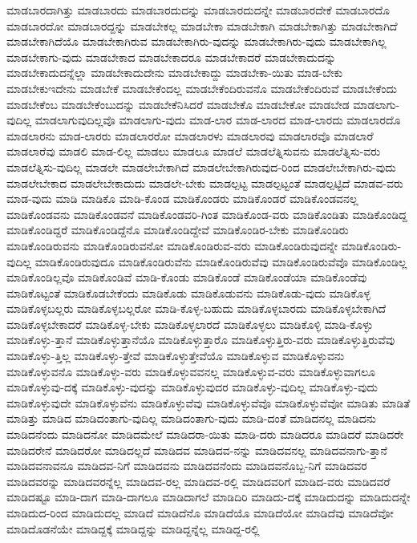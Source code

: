 {ಮಾಡಬಾರದಾಗಿತ್ತು
ಮಾಡಬಾರದು
ಮಾಡಬಾರದುದನ್ನು
ಮಾಡಬಾರದುದನ್ನೇ
ಮಾಡಬಾರದೇಕೆ
ಮಾಡಬಾರದೊ
ಮಾಡಬಾರದೋ
ಮಾಡಬಾರದ್ದನ್ನು
ಮಾಡಬೇಕಲ್ಲ
ಮಾಡಬೇಕಾ
ಮಾಡಬೇಕಾಗಿ
ಮಾಡಬೇಕಾಗಿತ್ತು
ಮಾಡಬೇಕಾಗಿದೆ
ಮಾಡಬೇಕಾಗಿದೆಯೊ
ಮಾಡಬೇಕಾಗಿರುವ
ಮಾಡಬೇಕಾಗಿರು-ವುದನ್ನು
ಮಾಡಬೇಕಾಗಿರು-ವುದು
ಮಾಡಬೇಕಾಗಿಲ್ಲ
ಮಾಡಬೇಕಾಗು-ವುದು
ಮಾಡಬೇಕಾದ
ಮಾಡಬೇಕಾದರೂ
ಮಾಡಬೇಕಾದರೆ
ಮಾಡಬೇಕಾದುದನ್ನು
ಮಾಡಬೇಕಾದುದನ್ನೆಲ್ಲಾ
ಮಾಡಬೇಕಾದುದೇನು
ಮಾಡಬೇಕಾದ್ದು
ಮಾಡಬೇಕಾ-ಯಿತು
ಮಾಡ-ಬೇಕು
ಮಾಡಬೇಕುಇದೇನು
ಮಾಡಬೇಕೆ
ಮಾಡಬೇಕೆಂದಲ್ಲ
ಮಾಡಬೇಕೆಂದಿರುವನೊ
ಮಾಡಬೇಕೆಂದಿರುವೆ
ಮಾಡಬೇಕೆಂದು
ಮಾಡಬೇಕೆಂಬ
ಮಾಡಬೇಕೆಂಬುದನ್ನು
ಮಾಡಬೇಕೆನಿಸಿದರೆ
ಮಾಡಬೇಕೊ
ಮಾಡಬೇಕೋ
ಮಾಡಬೇಡ
ಮಾಡಲಾಗು-ವುದಿಲ್ಲ
ಮಾಡಲಾಗುವುದಿಲ್ಲವೊ
ಮಾಡಲಾಗು-ವುದು
ಮಾಡ-ಲಾರ
ಮಾಡ-ಲಾರದ
ಮಾಡ-ಲಾರದು
ಮಾಡಲಾರದೊ
ಮಾಡಲಾರನು
ಮಾಡ-ಲಾರರು
ಮಾಡಲಾರರೋ
ಮಾಡಲಾರಳು
ಮಾಡಲಾರವು
ಮಾಡಲಾರವೊ
ಮಾಡಲಾರೆ
ಮಾಡಲಾರೆವು
ಮಾಡಲಿ
ಮಾಡ-ಲಿಲ್ಲ
ಮಾಡಲು
ಮಾಡಲೂ
ಮಾಡಲೆ
ಮಾಡಲೆತ್ನಿಸುವನು
ಮಾಡಲೆತ್ನಿಸು-ವರು
ಮಾಡಲೆತ್ನಿಸು-ವುದಿಲ್ಲ
ಮಾಡಲೇ
ಮಾಡಲೇಬೇಕಾಗಿದೆ
ಮಾಡಲೇಬೇಕಾಗಿರುವುದ-ರಿಂದ
ಮಾಡಲೇಬೇಕಾಗಿರು-ವುದು
ಮಾಡಲೇಬೇಕಾದ
ಮಾಡಲೇಬೇಕಾದುದು
ಮಾಡಲೇ-ಬೇಕು
ಮಾಡಲ್ಪಟ್ಟ
ಮಾಡಲ್ಪಟ್ಟಂತೆ
ಮಾಡಲ್ಪಟ್ಟಿದೆ
ಮಾಡವ-ವರು
ಮಾಡ-ವುದು
ಮಾಡಿ
ಮಾಡಿಕೊ
ಮಾಡಿ-ಕೊಂಡ
ಮಾಡಿಕೊಂಡರು
ಮಾಡಿಕೊಂಡರೆ
ಮಾಡಿಕೊಂಡವನಲ್ಲ
ಮಾಡಿಕೊಂಡವನು
ಮಾಡಿಕೊಂಡವನೆ
ಮಾಡಿಕೊಂಡವರಿ-ಗಿಂತ
ಮಾಡಿಕೊಂಡ-ವರು
ಮಾಡಿಕೊಂಡಿತು
ಮಾಡಿಕೊಂಡಿದ್ದ
ಮಾಡಿಕೊಂಡಿದ್ದರೆ
ಮಾಡಿಕೊಂಡಿದ್ದೆನೊ
ಮಾಡಿಕೊಂಡಿದ್ದೇವೆ
ಮಾಡಿಕೊಂಡಿರ-ಬೇಕು
ಮಾಡಿಕೊಂಡಿರು
ಮಾಡಿಕೊಂಡಿರುವನು
ಮಾಡಿಕೊಂಡಿರುವನೋ
ಮಾಡಿಕೊಂಡಿರುವ-ವರು
ಮಾಡಿಕೊಂಡಿರುವುದನ್ನೇ
ಮಾಡಿಕೊಂಡಿರು-ವುದಿಲ್ಲ
ಮಾಡಿಕೊಂಡಿರುವುದೂ
ಮಾಡಿಕೊಂಡಿರುವೆನು
ಮಾಡಿಕೊಂಡಿರುವೆವು
ಮಾಡಿಕೊಂಡಿರುವೆವೊ
ಮಾಡಿಕೊಂಡಿಲ್ಲ
ಮಾಡಿಕೊಂಡಿಲ್ಲವೊ
ಮಾಡಿಕೊಂಡಿವೆ
ಮಾಡಿ-ಕೊಂಡು
ಮಾಡಿಕೊಂಡೆ
ಮಾಡಿಕೊಂಡೆಯಾ
ಮಾಡಿಕೊಂಡೆವು
ಮಾಡಿಕೊಟ್ಟಂತೆ
ಮಾಡಿಕೊಡಬೇಕೆಂದು
ಮಾಡಿಕೊಡು
ಮಾಡಿಕೊಡುವನು
ಮಾಡಿಕೊಡು-ವುದು
ಮಾಡಿಕೊಳ್ಳ
ಮಾಡಿಕೊಳ್ಳಬಲ್ಲರು
ಮಾಡಿಕೊಳ್ಳಬಲ್ಲರೋ
ಮಾಡಿ-ಕೊಳ್ಳ-ಬಹುದು
ಮಾಡಿಕೊಳ್ಳಬಾರದು
ಮಾಡಿಕೊಳ್ಳಬೇಕಾಗಿದೆ
ಮಾಡಿಕೊಳ್ಳಬೇಕಾದರೆ
ಮಾಡಿಕೊಳ್ಳ-ಬೇಕು
ಮಾಡಿಕೊಳ್ಳಲಾರದೆ
ಮಾಡಿಕೊಳ್ಳಲು
ಮಾಡಿಕೊಳ್ಳಿ
ಮಾಡಿ-ಕೊಳ್ಳು
ಮಾಡಿಕೊಳ್ಳು-ತ್ತಾನೆ
ಮಾಡಿಕೊಳ್ಳುತ್ತಾನೆಯೊ
ಮಾಡಿಕೊಳ್ಳುತ್ತಾರೊ
ಮಾಡಿಕೊಳ್ಳುತ್ತಿರು-ವರು
ಮಾಡಿಕೊಳ್ಳುತ್ತಿರುವೆವು
ಮಾಡಿಕೊಳ್ಳು-ತ್ತಿಲ್ಲ
ಮಾಡಿಕೊಳ್ಳು-ತ್ತೇವೆ
ಮಾಡಿಕೊಳ್ಳುತ್ತೇವೆಯೊ
ಮಾಡಿಕೊಳ್ಳುವ
ಮಾಡಿಕೊಳ್ಳುವನು
ಮಾಡಿಕೊಳ್ಳುವನೊ
ಮಾಡಿಕೊಳ್ಳು-ವರು
ಮಾಡಿಕೊಳ್ಳುವವನಲ್ಲ
ಮಾಡಿಕೊಳ್ಳುವ-ವರು
ಮಾಡಿಕೊಳ್ಳುವಾಗಲೂ
ಮಾಡಿಕೊಳ್ಳುವು-ದಕ್ಕೆ
ಮಾಡಿಕೊಳ್ಳು-ವುದನ್ನು
ಮಾಡಿಕೊಳ್ಳುವುದರ
ಮಾಡಿಕೊಳ್ಳು-ವುದಿಲ್ಲ
ಮಾಡಿಕೊಳ್ಳು-ವುದು
ಮಾಡಿಕೊಳ್ಳುವುದೇ
ಮಾಡಿಕೊಳ್ಳುವೆನು
ಮಾಡಿಕೊಳ್ಳುವೆವು
ಮಾಡಿಕೊಳ್ಳುವೆವೊ
ಮಾಡಿಕೊಳ್ಳುವೆವೋ
ಮಾಡಿತು
ಮಾಡಿತೆ
ಮಾಡಿತ್ತು
ಮಾಡಿದ
ಮಾಡಿದಂತಾಗು-ವುದಿಲ್ಲ
ಮಾಡಿದಂತಾಗು-ವುದು
ಮಾಡಿ-ದಂತೆ
ಮಾಡಿದನಲ್ಲ
ಮಾಡಿದನು
ಮಾಡಿದನೆಂದು
ಮಾಡಿದನೋ
ಮಾಡಿದಮೇಲೆ
ಮಾಡಿದರಾ-ಯಿತು
ಮಾಡಿ-ದರು
ಮಾಡಿದರೂ
ಮಾಡಿದರೆ
ಮಾಡಿದರೇ
ಮಾಡಿದರೇನೆ
ಮಾಡಿದರೋ
ಮಾಡಿದಲ್ಲದೆ
ಮಾಡಿದವ
ಮಾಡಿದವ-ನನ್ನು
ಮಾಡಿದವನಲ್ಲ
ಮಾಡಿದವನಾಗು-ತ್ತಾನೆ
ಮಾಡಿದವನಾವನೂ
ಮಾಡಿದವ-ನಿಗೆ
ಮಾಡಿದವನು
ಮಾಡಿದವನೆಂದು
ಮಾಡಿದವನೊಬ್ಬ-ನಿಗೆ
ಮಾಡಿದವರ
ಮಾಡಿದವರನ್ನು
ಮಾಡಿದವರನ್ನೆಲ್ಲ
ಮಾಡಿದವ-ರಲ್ಲ
ಮಾಡಿದವ-ರಲ್ಲಿ
ಮಾಡಿದವರಿಗೆ
ಮಾಡಿದ-ವರು
ಮಾಡಿದವರೆ
ಮಾಡಿದಷ್ಟೂ
ಮಾಡಿ-ದಾಗ
ಮಾಡಿ-ದಾಗಲೂ
ಮಾಡಿದಾಗಲೆ
ಮಾಡಿದಿರಿ
ಮಾಡಿದು-ದಕ್ಕೆ
ಮಾಡಿದುದನ್ನು
ಮಾಡಿದುದನ್ನೇ
ಮಾಡಿದುದ-ರಿಂದ
ಮಾಡಿದುದಲ್ಲ
ಮಾಡಿದೆ
ಮಾಡಿದೆನೊ
ಮಾಡಿದೆಯೊ
ಮಾಡಿದೆಯೋ
ಮಾಡಿದೆವು
ಮಾಡಿದೆವೋ
ಮಾಡಿದೊಡನೆಯೇ
ಮಾಡಿದ್ದಕ್ಕೆ
ಮಾಡಿದ್ದನ್ನು
ಮಾಡಿದ್ದನ್ನೆಲ್ಲ
ಮಾಡಿದ್ದ-ರಲ್ಲಿ
}
